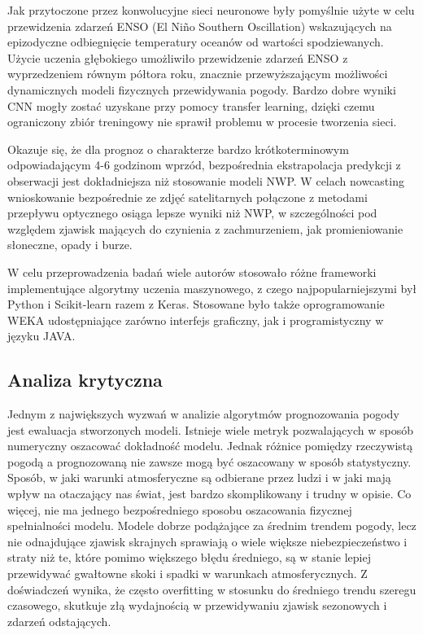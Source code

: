 Jak przytoczone przez \cite{ai-revolutionises-weather-prediction}
konwolucyjne sieci neuronowe były pomyślnie użyte w celu przewidzenia zdarzeń ENSO 
(El Niño Southern Oscillation) wskazujących na epizodyczne odbiegnięcie temperatury oceanów 
od wartości spodziewanych. Użycie uczenia głębokiego umożliwiło przewidzenie zdarzeń ENSO z 
wyprzedzeniem równym półtora roku, znacznie przewyższającym możliwości dynamicznych modeli
fizycznych przewidywania pogody. Bardzo dobre wyniki CNN mogły zostać uzyskane przy pomocy
transfer learning, dzięki czemu ograniczony zbiór treningowy nie sprawił problemu w procesie 
tworzenia sieci.

Okazuje się, że dla prognoz o charakterze bardzo krótkoterminowym odpowiadającym 4-6 godzinom 
wprzód, bezpośrednia ekstrapolacja predykcji z obserwacji jest dokładniejsza niż 
stosowanie modeli NWP\cite{ai-revolutionises-weather-prediction}. W celach nowcasting
wnioskowanie bezpośrednie ze zdjęć satelitarnych połączone z metodami przepływu optycznego osiąga
lepsze wyniki niż NWP, w szczególności pod względem zjawisk mających do czynienia z zachmurzeniem,
jak promieniowanie słoneczne, opady i burze. 

W celu przeprowadzenia badań wiele autorów stosowało różne frameworki implementujące algorytmy uczenia
maszynowego, z czego najpopularniejszymi był Python\cite{python} i Scikit-learn\cite{sklearn}
razem z Keras\cite{keras}. Stosowane było także oprogramowanie WEKA udostępniające zarówno interfejs
graficzny, jak i programistyczny w języku JAVA.


\subsection{Analiza krytyczna}

Jednym z największych wyzwań w analizie algorytmów prognozowania pogody jest ewaluacja 
stworzonych modeli. Istnieje wiele metryk pozwalających w sposób numeryczny oszacować
dokładność modelu. Jednak różnice pomiędzy rzeczywistą pogodą a prognozowaną nie zawsze
mogą być oszacowany w sposób statystyczny. Sposób, w jaki warunki atmosferyczne są odbierane
przez ludzi i w jaki mają wpływ na otaczający nas świat, jest bardzo skomplikowany i trudny
w opisie. Co więcej, nie ma jednego bezpośredniego sposobu oszacowania fizycznej spełnialności
modelu\cite{deep-learning-for-improving-numerical}.
Modele dobrze podążające za średnim trendem pogody, lecz nie odnajdujące
zjawisk skrajnych sprawiają o wiele większe niebezpieczeństwo i straty niż te, które
pomimo większego błędu średniego, są w stanie lepiej przewidywać gwałtowne skoki i spadki
w warunkach atmosferycznych. Z doświadczeń wynika, że często overfitting w stosunku do
średniego trendu szeregu czasowego, skutkuje złą wydajnością w przewidywaniu
zjawisk sezonowych i zdarzeń odstających.

